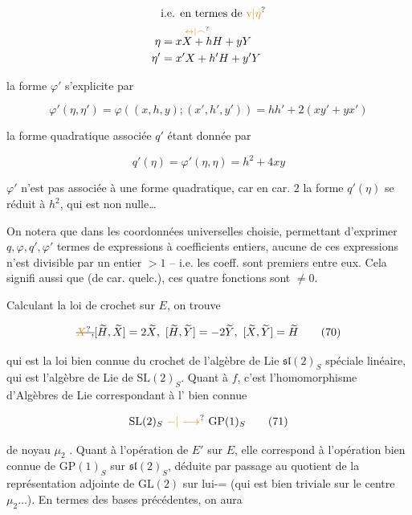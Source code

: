 \[
\begin{aligned}
&\text{i.e. en termes de \unsure{v|$\eta$}}\\
\eta&=x\overset{\unsure{\leftrightarrow|\frown}}{X+h}H+yY\\
\eta'&=x'X+h'H+y'Y
\end{aligned}
\]

la forme $\varphi'$ s'explicite par

\[
\varphi'(\eta,\eta')=\varphi((x,h,y);(x',h',y'))=hh'+2(xy'+yx') \tag*{(68)}
\]

la forme quadratique associée $q'$ étant donnée par

\[
q'(\eta)=\varphi'(\eta,\eta)=h^2+4xy \tag*{(69)}
\]

  $\varphi'$ n'est pas associée à une forme quadratique,  car en car. 2 la forme $q'(\eta)$ se réduit à $h^2$, qui est non nulle\ldots

On notera que dans les coordonnées universelles choisie, permettant d'exprimer $q,\varphi,q',\varphi'$  termes de  expressions  à coefficients entiers, aucune de ces expressions n'est divisible par un entier $>1$ -- i.e. les coeff. sont premiers entre eux. Cela signifi aussi que   (de car. quelc.), ces quatre fonctions sont $\ne0$.

Calculant la loi de crochet sur $E$, on trouve

\[
\deleted{\unsure{X},}[\widetilde H,\widetilde X]=2\widetilde X,\ [\widetilde H,\widetilde Y]=-2\widetilde Y,\ [\widetilde X,\widetilde Y]=\widetilde H \tag*{(70)}
\]

qui est la loi bien connue du crochet de l'algèbre de Lie $\mathfrak{sl}(2)_S$ spéciale linéaire, qui est l'algèbre de Lie de $\mathrm{SL}(2)_S$. Quant à $f$, c'est l'homomorphisme d'Algèbres de Lie correspondant à l'  bien connue

\[
\mathrm{SL}(2)_S\ \unsure{\mathbin{-}|\longrightarrow}\ \mathrm{GP}(1)_S \tag*{(71)}
\]

 de noyau $\mu_2$ . Quant à l'opération de $E'$ sur $E$, elle correspond à l'opération bien connue de $\mathrm{GP}(1)_S$ sur $\mathfrak{sl}(2)_S$, déduite par passage au quotient de la représentation adjointe de $\mathrm{GL}(2)$ sur lui-= (qui est bien triviale sur le centre $\mu_2\ldots$). En termes des bases précédentes, on aura

